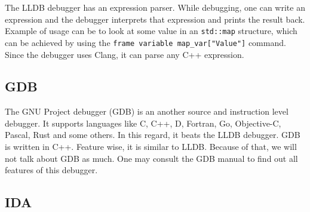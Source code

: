 The LLDB debugger has an expression parser. While debugging, one can write an
expression and the debugger interprets that expression and prints the result
back. Example of usage can be to look at some value in an \texttt{std::map}
structure, which can be achieved by using the \texttt{frame variable
map\_var["Value"]} command. Since the debugger uses Clang, it can parse
any C++ expression.

\subsection{GDB}
The GNU Project debugger (GDB) is an another source and instruction level
debugger. It supports languages like C, C++, D, Fortran, Go, Objective-C,
Pascal, Rust and some others. In this regard, it beats the LLDB debugger. GDB
is written in C++. Feature wise, it is similar to LLDB. Because of that, we
will not talk about GDB as much. One may consult the GDB manual
\cite{gdb-manual} to find out all features of this debugger.

\subsection{IDA}
